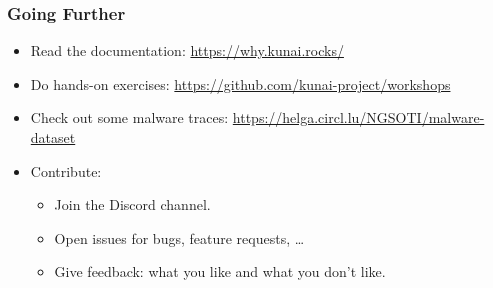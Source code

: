 \begin{frame}
	\frametitle{Going Further}

	\begin{itemize}
		\item Read the documentation: \url{https://why.kunai.rocks/}
		\item Do hands-on exercises: \url{https://github.com/kunai-project/workshops}
		\item Check out some malware traces: \url{https://helga.circl.lu/NGSOTI/malware-dataset}
		\item Contribute:
		      \begin{itemize}
			      \item Join the Discord channel.
			      \item Open issues for bugs, feature requests, \ldots
			      \item Give feedback: what you like and what you don't like.
		      \end{itemize}
	\end{itemize}
\end{frame}
